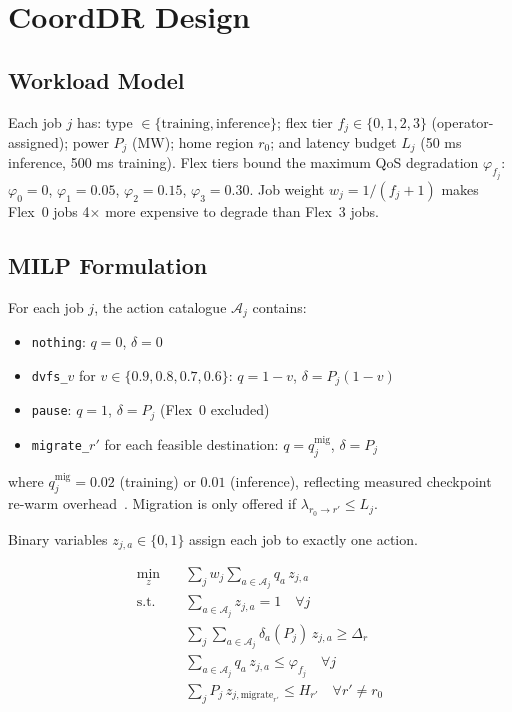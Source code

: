 \documentclass[sigplan,10pt,review]{acmart}
\newcommand{\sysname}{CoordDR\xspace}
\begin{document}
\section{\sysname Design}
\label{sec:design}

\subsection{Workload Model}

Each job $j$ has: type $\in \{\text{training}, \text{inference}\}$; flex tier
$f_j \in \{0,1,2,3\}$ (operator-assigned); power $P_j$ (MW); home region
$r_0$; and latency budget $L_j$ (50 ms inference, 500 ms training).  Flex
tiers bound the maximum QoS degradation $\varphi_{f_j}$:
$\varphi_0 = 0$, $\varphi_1 = 0.05$, $\varphi_2 = 0.15$, $\varphi_3 = 0.30$.
Job weight $w_j = 1/(f_j + 1)$ makes Flex~0 jobs 4$\times$ more expensive to
degrade than Flex~3 jobs.

\subsection{MILP Formulation}

For each job $j$, the action catalogue $\mathcal{A}_j$ contains:
\begin{itemize}
  \item \texttt{nothing}: $q=0$, $\delta=0$
  \item \texttt{dvfs\_}$v$ for $v \in \{0.9, 0.8, 0.7, 0.6\}$:
        $q = 1{-}v$, $\delta = P_j(1{-}v)$
  \item \texttt{pause}: $q=1$, $\delta=P_j$ (Flex~0 excluded)
  \item \texttt{migrate\_}$r'$ for each feasible destination:
        $q = q^{\text{mig}}_j$, $\delta = P_j$
\end{itemize}
where $q^{\text{mig}}_j = 0.02$ (training) or $0.01$ (inference), reflecting
measured checkpoint re-warm overhead~\cite{trainmover2024,serverlessllm2024}.
Migration is only offered if $\lambda_{r_0 \to r'} \leq L_j$.

Binary variables $z_{j,a} \in \{0,1\}$ assign each job to exactly one action.

\begin{align}
\min_{z} \quad & \sum_j w_j \sum_{a \in \mathcal{A}_j} q_a \, z_{j,a}
\label{eq:obj} \\
\text{s.t.} \quad
& \sum_{a \in \mathcal{A}_j} z_{j,a} = 1 \quad \forall j
\label{eq:mutex} \\
& \sum_j \sum_{a \in \mathcal{A}_j} \delta_a(P_j)\, z_{j,a} \geq \Delta_r
\label{eq:curtailment} \\
& \sum_{a \in \mathcal{A}_j} q_a\, z_{j,a} \leq \varphi_{f_j} \quad \forall j
\label{eq:sla} \\
& \sum_j P_j\, z_{j,\text{migrate}_{r'}} \leq H_{r'} \quad \forall r' \neq r_0
\label{eq:capacity}
\end{align}
\end{document}
